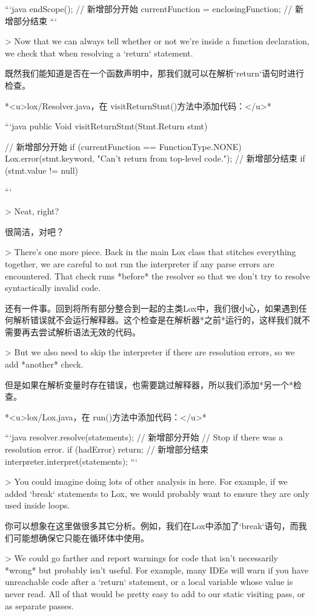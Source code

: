 \documentclass[cn,11pt,chinese]{elegantbook}
\begin{document}
{{{{{{{{{{{{{{{{{```java
    endScope();
    // 新增部分开始
    currentFunction = enclosingFunction;
    // 新增部分结束
  }
```

> Now that we can always tell whether or not we’re inside a function declaration, we check that when resolving a `return` statement.

既然我们能知道是否在一个函数声明中，那我们就可以在解析`return`语句时进行检查。

*<u>lox/Resolver.java，在 visitReturnStmt()方法中添加代码：</u>*

```java
  public Void visitReturnStmt(Stmt.Return stmt) {
    // 新增部分开始
    if (currentFunction == FunctionType.NONE) {
      Lox.error(stmt.keyword, "Can't return from top-level code.");
    }
    // 新增部分结束
    if (stmt.value != null) {
```

> Neat, right?

很简洁，对吧？

> There’s one more piece. Back in the main Lox class that stitches everything together, we are careful to not run the interpreter if any parse errors are encountered. That check runs *before* the resolver so that we don’t try to resolve syntactically invalid code.

还有一件事。回到将所有部分整合到一起的主类Lox中，我们很小心，如果遇到任何解析错误就不会运行解释器。这个检查是在解析器*之前*运行的，这样我们就不需要再去尝试解析语法无效的代码。

> But we also need to skip the interpreter if there are resolution errors, so we add *another* check.

但是如果在解析变量时存在错误，也需要跳过解释器，所以我们添加*另一个*检查。

*<u>lox/Lox.java，在 run()方法中添加代码：</u>*

```java
    resolver.resolve(statements);
    // 新增部分开始
    // Stop if there was a resolution error.
    if (hadError) return;
    // 新增部分结束
    interpreter.interpret(statements);
```

> You could imagine doing lots of other analysis in here. For example, if we added `break` statements to Lox, we would probably want to ensure they are only used inside loops.

你可以想象在这里做很多其它分析。例如，我们在Lox中添加了`break`语句，而我们可能想确保它只能在循环体中使用。

> We could go farther and report warnings for code that isn’t necessarily *wrong* but probably isn’t useful. For example, many IDEs will warn if you have unreachable code after a `return` statement, or a local variable whose value is never read. All of that would be pretty easy to add to our static visiting pass, or as separate passes.

}}}}}}}}}}}}}}}}}}
\end{document}
